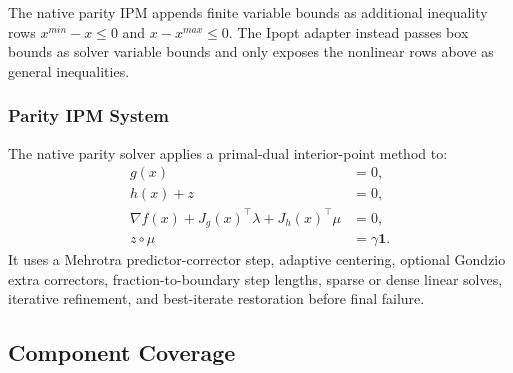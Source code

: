 The native parity IPM appends finite variable bounds as additional inequality
rows \(x^{min}-x\le0\) and \(x-x^{max}\le0\).  The Ipopt adapter instead passes
box bounds as solver variable bounds and only exposes the nonlinear rows above
as general inequalities.

\subsubsection{Parity IPM System}

The native parity solver applies a primal-dual interior-point method to:
\begin{align}
g(x)&=0,\\
h(x)+z&=0,\\
\nabla f(x)+J_g(x)^{\top}\lambda+J_h(x)^{\top}\mu&=0,\\
z\circ\mu&=\gamma\mathbf{1}.
\end{align}
It uses a Mehrotra predictor-corrector step, adaptive centering, optional
Gondzio extra correctors, fraction-to-boundary step lengths, sparse or dense
linear solves, iterative refinement, and best-iterate restoration before final
failure.

\subsection{Component Coverage}

